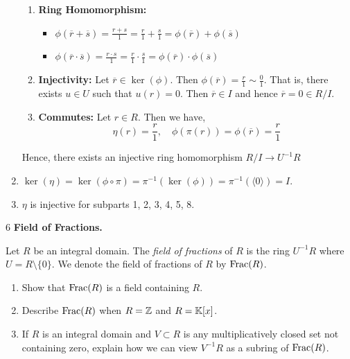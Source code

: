 \documentclass[Notebook.tex]{subfiles}
\begin{document}
\begin{solution}
\begin{enumerate}
\begin{enumerate}
			\item \textbf{Ring Homomorphism:} 
			\begin{itemize}
				\item $\phi(\overline{r} + \overline{s}) = \frac{r+s}{1} = \frac{r}{1} + \frac{s}{1} = \phi(\overline{r}) + \phi(\overline{s})$
				\item $\phi(\overline{r} \cdot \overline{s}) = \frac{r\cdot s}{1} = \frac{r}{1} \cdot \frac{s}{1} = \phi(\overline{r}) \cdot \phi(\overline{s})$
			\end{itemize}
			\item \textbf{Injectivity:} Let $\overline{r} \in \ker(\phi)$. Then $\phi(\overline{r}) = \frac{r}{1} \sim \frac{0}{1}$. That is, there exists $u \in U$ such that $u(r) = 0$. Then $\overline{r} \in I$ and hence $\overline{r} = 0 \in R/I$. 
			\item \textbf{Commutes:} Let $r \in R$. Then we have, 
			\[\eta(r) = \frac{r}{1}, \quad \phi(\pi(r)) = \phi(\overline{r}) = \frac{r}{1}\]
		\end{enumerate}
		Hence, there exists an injective ring homomorphism $R/I \to U^{-1}R$

		\item $\ker(\eta ) = \ker(\phi \circ \pi) = \pi^{-1}(\ker(\phi)) = \pi^{-1}(\langle 0 \rangle) = I$. 
		
		\item $\eta$ is injective for subparts 1, 2, 3, 4, 5, 8. 
	\end{enumerate}
\end{solution}

\newpage 

\begin{problem}{6}
	\textbf{Field of Fractions.} 
	
	Let $R$ be an integral domain. The \emph{field of fractions} of $R$ is the ring $U^{-1}R$ where $U=R\setminus\{0\}$. We denote the field of fractions of $R$ by $\text{Frac}(R)$.
	\begin{enumerate}
		\item Show that $\text{Frac}(R)$ is a field containing $R$.
		\item Describe $\text{Frac}(R)$ when $R=\mathbb Z$ and $R=\mathbb K[x]$.
		\item If $R$ is an integral domain and $V \subset R$ is any multiplicatively closed set not containing zero, explain how we can view $V^{-1}R$ as a subring of $\text{Frac}(R)$. 
	\end{enumerate}
\end{problem}
\end{document}
